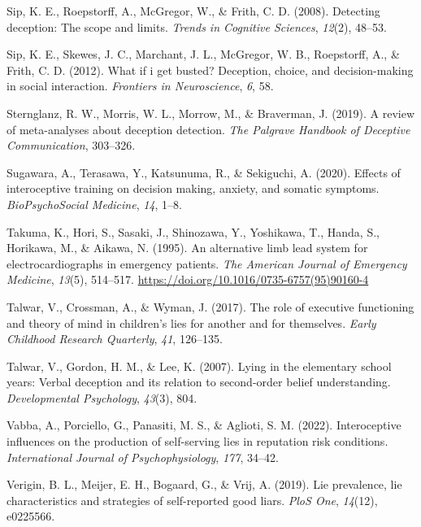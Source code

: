 \documentclass[
  man,mask,floatsintext]{apa6}
\newlength{\cslhangindent}
\newenvironment{CSLReferences}[2] %
 {\begin{list}{}{%
  \setlength{\itemindent}{0pt}
  \setlength{\leftmargin}{0pt}
  \setlength{\parsep}{0pt}
  \ifodd #1
   \setlength{\leftmargin}{\cslhangindent}
   \setlength{\itemindent}{-1\cslhangindent}
  \fi
  \setlength{\itemsep}{#2\baselineskip}}}
 {\end{list}}
\begin{document}
\begin{CSLReferences}{1}{0}
Sip, K. E., Roepstorff, A., McGregor, W., \& Frith, C. D. (2008). Detecting deception: The scope and limits. \emph{Trends in Cognitive Sciences}, \emph{12}(2), 48--53.

Sip, K. E., Skewes, J. C., Marchant, J. L., McGregor, W. B., Roepstorff, A., \& Frith, C. D. (2012). What if i get busted? Deception, choice, and decision-making in social interaction. \emph{Frontiers in Neuroscience}, \emph{6}, 58.

Sternglanz, R. W., Morris, W. L., Morrow, M., \& Braverman, J. (2019). A review of meta-analyses about deception detection. \emph{The Palgrave Handbook of Deceptive Communication}, 303--326.

Sugawara, A., Terasawa, Y., Katsunuma, R., \& Sekiguchi, A. (2020). Effects of interoceptive training on decision making, anxiety, and somatic symptoms. \emph{BioPsychoSocial Medicine}, \emph{14}, 1--8.

Takuma, K., Hori, S., Sasaki, J., Shinozawa, Y., Yoshikawa, T., Handa, S., Horikawa, M., \& Aikawa, N. (1995). An alternative limb lead system for electrocardiographs in emergency patients. \emph{The American Journal of Emergency Medicine}, \emph{13}(5), 514--517. \url{https://doi.org/10.1016/0735-6757(95)90160-4}

Talwar, V., Crossman, A., \& Wyman, J. (2017). The role of executive functioning and theory of mind in children's lies for another and for themselves. \emph{Early Childhood Research Quarterly}, \emph{41}, 126--135.

Talwar, V., Gordon, H. M., \& Lee, K. (2007). Lying in the elementary school years: Verbal deception and its relation to second-order belief understanding. \emph{Developmental Psychology}, \emph{43}(3), 804.

Vabba, A., Porciello, G., Panasiti, M. S., \& Aglioti, S. M. (2022). Interoceptive influences on the production of self-serving lies in reputation risk conditions. \emph{International Journal of Psychophysiology}, \emph{177}, 34--42.

Verigin, B. L., Meijer, E. H., Bogaard, G., \& Vrij, A. (2019). Lie prevalence, lie characteristics and strategies of self-reported good liars. \emph{PloS One}, \emph{14}(12), e0225566.


\end{CSLReferences}
\end{document}
